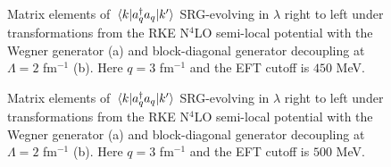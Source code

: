 \documentclass[preprintnumbers,floatfix,aps,prc,preprint,nofootinbib]{revtex4-1}
\begin{document}
\begin{figure}[H]
	\centering
	
	\caption{Matrix elements of $\mel{k}{a^{\dagger}_q a_q}{k'}$ SRG-evolving in $\lambda$ right to left under transformations from the RKE N$^4$LO semi-local potential with the Wegner generator (a) and block-diagonal generator decoupling at $\Lambda=2$ fm$^{-1}$ (b). Here $q=3$ fm$^{-1}$ and the EFT cutoff is $450$ MeV.}
	\label{momentum_projection_contours_q3,00_kvnn111}
\end{figure}

\begin{figure}[H]
	\centering
	
	\caption{Matrix elements of $\mel{k}{a^{\dagger}_q a_q}{k'}$ SRG-evolving in $\lambda$ right to left under transformations from the RKE N$^4$LO semi-local potential with the Wegner generator (a) and block-diagonal generator decoupling at $\Lambda=2$ fm$^{-1}$ (b). Here $q=3$ fm$^{-1}$ and the EFT cutoff is $500$ MeV.}
	\label{momentum_projection_contours_q3,00_kvnn112}
\end{figure}
\end{document}
